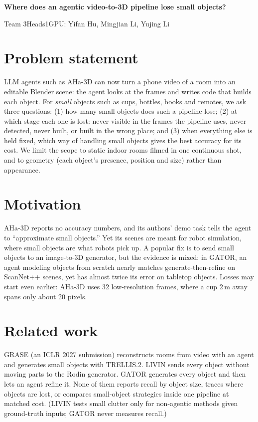 \documentclass[11pt]{article}
\begin{document}
\begin{center}
{\large\bfseries Where does an agentic video-to-3D pipeline lose small objects?}\par\vspace{3pt}
{\small Team 3Heads1GPU: Yifan Hu, Mingjian Li, Yujing Li}
\end{center}
\vspace{-8pt}

\section*{Problem statement}
LLM agents such as AHa-3D can now turn a phone video of a room into an editable Blender scene: the agent looks at the frames and writes code that builds each object. For \emph{small} objects such as cups, bottles, books and remotes, we ask three questions: (1) how many small objects does such a pipeline lose; (2) at which stage each one is lost: never visible in the frames the pipeline uses, never detected, never built, or built in the wrong place; and (3) when everything else is held fixed, which way of handling small objects gives the best accuracy for its cost. We limit the scope to static indoor rooms filmed in one continuous shot, and to geometry (each object's presence, position and size) rather than appearance.

\section*{Motivation}
AHa-3D reports no accuracy numbers, and its authors' demo task tells the agent to ``approximate small objects.'' Yet its scenes are meant for robot simulation, where small objects are what robots pick up. A popular fix is to send small objects to an image-to-3D generator, but the evidence is mixed: in GATOR, an agent modeling objects from scratch nearly matches generate-then-refine on ScanNet++ scenes, yet has almost twice its error on tabletop objects. Losses may start even earlier: AHa-3D uses 32 low-resolution frames, where a cup 2\,m away spans only about 20 pixels.

\section*{Related work}
GRASE (an ICLR 2027 submission) reconstructs rooms from video with an agent and generates small objects with \mbox{TRELLIS.2}. LIVIN sends every object without moving parts to the Rodin generator. GATOR generates every object and then lets an agent refine it. None of them reports recall by object size, traces where objects are lost, or compares small-object strategies inside one pipeline at matched cost. (LIVIN tests small clutter only for non-agentic methods given ground-truth inputs; GATOR never measures recall.)
\end{document}
